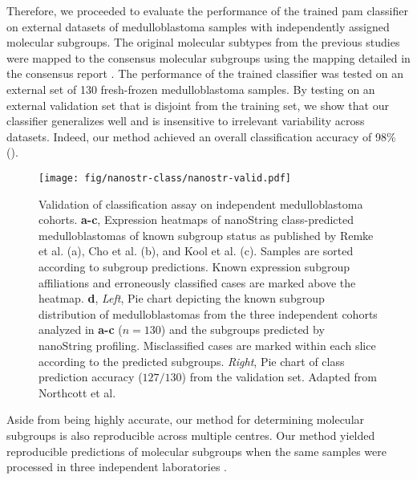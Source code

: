 Therefore, we proceeded to evaluate the performance of the trained \gls{pam} classifier on external datasets of medulloblastoma samples with independently assigned molecular subgroups. The original molecular subtypes from the previous studies were mapped to the consensus molecular subgroups using the mapping detailed in the consensus report . The performance of the trained classifier was tested on an external set of 130 fresh-frozen medulloblastoma samples. By testing on an external validation set that is disjoint from the training set, we show that our classifier generalizes well and is insensitive to irrelevant variability across datasets. Indeed, our method achieved an overall classification accuracy of 98\% ().

\begin{figure}[hb]
	\begin{center}
		\texttt{[image: fig/nanostr-class/nanostr-valid.pdf]}
	\end{center}
	\caption[Validation of classification assay on independent medulloblastoma cohorts]
	{
	Validation of classification assay on independent medulloblastoma cohorts.
	\textbf{a-c}, Expression heatmaps of nanoString class-predicted medulloblastomas of known subgroup status as published by Remke et al. (a), Cho et al. (b), and Kool et al. (c). Samples are sorted according to subgroup predictions. Known expression subgroup affiliations and erroneously classified cases are marked above the heatmap.
	\textbf{d}, \emph{Left}, Pie chart depicting the known subgroup distribution of medulloblastomas from the three independent cohorts analyzed in \textbf{a-c} ($n = 130$) and the subgroups predicted by nanoString profiling. Misclassified cases are marked within each slice according to the predicted subgroups. \emph{Right}, Pie chart of class prediction accuracy ($127/130$) from the validation set. Adapted from Northcott et al.
	}
	\label{fig:nanostr-valid}
\end{figure}

Aside from being highly accurate, our method for determining molecular subgroups is also reproducible across multiple centres. Our method yielded reproducible predictions of molecular subgroups when the same samples were processed in three independent laboratories . 

\clearpage

